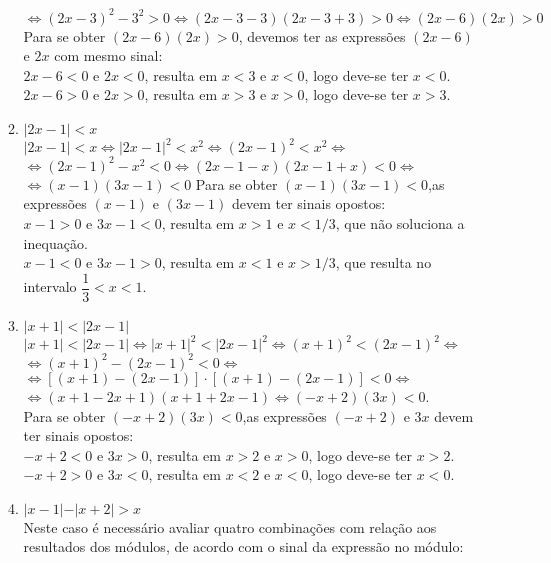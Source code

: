 \documentclass[10pt]{book}
\begin{document}
\begin{enumerate}
\begin{enumerate}
		$\Leftrightarrow (2x - 3)^2 - 3^2 > 0 \Leftrightarrow (2x - 3 - 3)(2x - 3 + 3) >  0 \Leftrightarrow (2x-6)(2x) > 0$ \\
		Para se obter  $(2x-6)(2x) > 0$, devemos ter as expressões  $(2x-6)$ e $2x$  com mesmo sinal:\\
		$2x-6 < 0$ e $2x < 0$,  resulta em $x < 3$ e $x < 0$, logo deve-se ter $x < 0$.\\
		$2x-6 > 0$ e $2x > 0$,  resulta em $x > 3$ e $x > 0$, logo deve-se ter $x > 3$.
		\item %
		$\vert 2x - 1 \vert < x$\\
		$\vert 2x - 1 \vert < x \Leftrightarrow \vert 2x - 1 \vert^2 < x^2 \Leftrightarrow ( 2x - 1 )^2 < x^2 \Leftrightarrow$\\
		$\Leftrightarrow (2x-1)^2 - x^2 < 0 \Leftrightarrow (2x - 1 -x)(2x-1+x) < 0 \Leftrightarrow$\\
		$\Leftrightarrow (x-1)(3x-1) < 0$
		Para se obter  $(x-1)(3x-1) < 0$,as expressões $(x-1)$ e $(3x-1)$ devem ter sinais opostos:\\
		$x-1 >0$ e $3x-1 <0$, resulta em $x > 1$ e $x < 1/3$, que não soluciona a inequação.\\
		$x-1 <0$ e $3x-1 >0$, resulta em $x < 1$ e $x > 1/3$, que resulta no intervalo $\dfrac{1}{3}<x<1$.
		\addtocounter{enumii}{1}
		\item %
		$\vert x+ 1 \vert < \vert 2x - 1 \vert$\\
		$\vert x+ 1 \vert < \vert 2x - 1 \vert \Leftrightarrow \vert x+ 1 \vert^2 < \vert 2x - 1 \vert^2 \Leftrightarrow ( x + 1 )^2 < ( 2x - 1 )^2 \Leftrightarrow$\\ 
		$\Leftrightarrow ( x + 1 )^2 - ( 2x - 1 )^2 < 0 \Leftrightarrow$\\
		$\Leftrightarrow [( x + 1 ) - ( 2x - 1 )]\cdot[( x + 1 ) - ( 2x - 1 )] < 0 \Leftrightarrow$\\ 
		$\Leftrightarrow (x + 1 -2x +1)(x+1+2x-1) \Leftrightarrow (-x+2)(3x)<0$.\\
		Para se obter  $(-x+2)(3x)<0$,as expressões $(-x+2)$ e $3x$ devem ter sinais opostos:\\
		$-x+2 < 0$ e $3x > 0$,  resulta em $x > 2$ e $x > 0$, logo deve-se ter $x > 2$.\\
		$-x+2 > 0$ e $3x < 0$,  resulta em $x < 2$ e $x < 0$, logo deve-se ter $x < 0$.
		\item %
		$\vert x - 1 \vert - \vert x + 2 \vert > x$\\
		Neste caso é necessário avaliar quatro combinações com relação aos resultados dos módulos, de acordo com o sinal da expressão no módulo:

\end{enumerate}
\end{enumerate}
\end{document}
